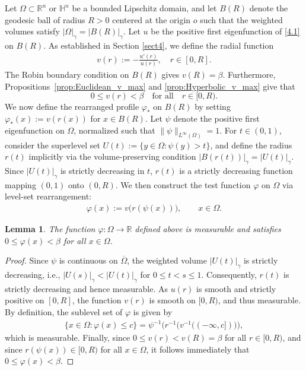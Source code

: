 \documentclass[11pt,leqno]{amsart}
\newtheorem{lemma}{Lemma}[section]
\def\R{\mathbb{R}}
\numberwithin{equation}{section}
\begin{document}
Let $\Omega \subset \R^n$ or $\mathbb{H}^n$ be a bounded Lipschitz domain, and let $B(R)$ denote the geodesic ball of radius $R>0$ centered at the origin $o$ such that the weighted volumes satisfy 
 $|\Omega|_\gamma = |B(R)|_\gamma$.
Let $u$ be the positive first eigenfunction of \eqref{4.1} on $B(R)$. As established in Section \ref{sect4}, we define the radial function
\begin{align*}
v(r) := -\frac{u'(r)}{u(r)}, \quad r \in [0, R].
\end{align*}
The Robin boundary condition on $B(R)$ gives $v(R) = \beta$. Furthermore, Propositions~\ref{prop:Euclidean_v_max} and \ref{prop:Hyperbolic_v_max} give that 
$$0 \le v(r) < \beta \quad \text{for all}\quad  r \in [0, R).$$
We  now define the rearranged profile $\varphi_*$ on $B(R)$ by setting $\varphi_*(x) := v(r(x))$ for $x \in B(R)$.
Let $\psi$ denote the positive first eigenfunction on $\Omega$, normalized such that $\|\psi\|_{L^\infty(\Omega)}=1$.
For $t\in(0,1)$, consider the superlevel set $U(t):=\{y\in\Omega:\psi(y)>t\}$, and define the radius $r(t)$ implicitly via the volume-preserving condition $|B(r(t))|_\gamma=|U(t)|_\gamma$. Since $|U(t)|_\gamma$ is strictly decreasing in $t$, $r(t)$ is a strictly decreasing function mapping $(0,1)$ onto $(0,R)$. We then construct the test function $\varphi$ on $\Omega$  via level-set rearrangement:
\begin{align*}
\varphi(x) := v\big(r(\psi(x))\big), \qquad x\in\Omega.
\end{align*}

\begin{lemma}\label{phi inequality beta}
    The function $\varphi:\Omega\rightarrow \mathbb{R}$ defined above is measurable and satisfies $0\leq \varphi(x) < \beta$ for all $x \in \Omega$.
\end{lemma}

\begin{proof}
    Since $\psi$ is continuous on $\overline{\Omega}$, the weighted volume  $|U(t)|_\gamma$ is strictly decreasing, i.e., $|U(s)|_\gamma < |U(t)|_\gamma$ for $0\leq t<s\leq 1$. Consequently, $r(t)$ is strictly decreasing and hence measurable. As $u(r)$ is smooth and strictly positive on $[0, R]$, the function $v(r)$ is smooth on $[0,R)$,  and thus measurable. By definition, the sublevel set of $\varphi$ is given by
    \begin{align*}
       \Big \{x\in \Omega : \varphi(x) \leq c\Big\} = \psi^{-1}\Big(r^{-1}\big(v^{-1}((-\infty,c])\big)\Big),
    \end{align*}
    which is  measurable.  Finally, since $0 \le v(r) < v(R) = \beta$ for all $r \in [0,R)$, and since $r(\psi(x)) \in [0, R)$ for all $x \in \Omega$, it follows immediately that $0 \le \varphi(x) < \beta$.
\end{proof}
\end{document}
